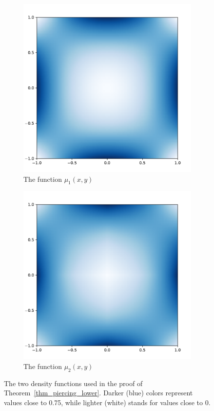 \documentclass[11pt,a4paper]{amsart}
\begin{document}
\begin{figure}
\centering
\begin{subfigure}{.5\textwidth}
  \centering
  \includegraphics[width=.7\linewidth]{Figures/mu1.pdf}
  \caption{The function $\mu_1(x,y)$}
  \label{fig4a}
\end{subfigure}%
\begin{subfigure}{.5\textwidth}
  \centering
  \includegraphics[width=.7\linewidth]{Figures/mu2.pdf}
  \caption{The function $\mu_2(x,y)$}
  \label{fig4b}
\end{subfigure}
\caption{The two density functions used in the proof of Theorem~\ref{thm_piercing_lower}. Darker (blue) colors represent values close to 0.75, while lighter (white) stands for values close to 0.}
\label{fig4}
\end{figure}
\end{document}
